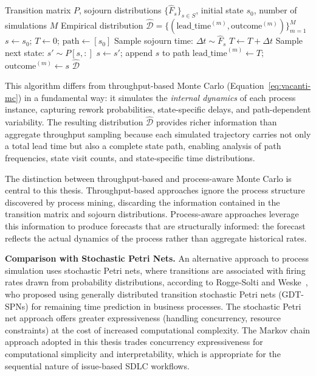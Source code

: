 \begin{algorithm}
\caption{Process-Aware Monte Carlo Simulation}
\label{alg:mc-simulation}
\begin{algorithmic}[1]
\REQUIRE Transition matrix $P$, sojourn distributions $\{\hat{F}_s\}_{s \in S}$, initial state $s_0$, number of simulations $M$
\ENSURE Empirical distribution $\hat{\mathcal{D}} = \{(\text{lead\_time}^{(m)}, \text{outcome}^{(m)})\}_{m=1}^{M}$
    \STATE $s \gets s_0$; $T \gets 0$; $\text{path} \gets [s_0]$
        \STATE Sample sojourn time: $\Delta t \sim \hat{F}_s$
        \STATE $T \gets T + \Delta t$
        \STATE Sample next state: $s' \sim P[s, :]$
        \STATE $s \gets s'$; append $s$ to path
    \ENDWHILE
    \STATE $\text{lead\_time}^{(m)} \gets T$; $\text{outcome}^{(m)} \gets s$
\ENDFOR
\RETURN $\hat{\mathcal{D}}$
\end{algorithmic}
\end{algorithm}

This algorithm differs from throughput-based Monte Carlo
(Equation~\ref{eq:vacanti-mc}) in a fundamental way: it simulates the
\emph{internal dynamics} of each process instance, capturing rework
probabilities, state-specific delays, and path-dependent variability.
The resulting distribution $\hat{\mathcal{D}}$ provides richer information
than aggregate throughput sampling because each simulated trajectory
carries not only a total lead time but also a complete state path, enabling
analysis of path frequencies, state visit counts, and state-specific
time distributions.

The distinction between throughput-based and process-aware Monte Carlo
is central to this thesis. Throughput-based approaches ignore the process
structure discovered by process mining, discarding the information
contained in the transition matrix and sojourn distributions.
Process-aware approaches leverage this information to produce forecasts
that are structurally informed: the forecast reflects the actual dynamics
of the process rather than aggregate historical rates.

\textbf{Comparison with Stochastic Petri Nets.} An alternative approach
to process simulation uses stochastic Petri nets, where transitions are
associated with firing rates drawn from probability
distributions, according to Rogge-Solti and
Weske~\cite{RoggeSolti2015NonMarkovianSPN}, who proposed using generally
distributed transition stochastic Petri nets (GDT-SPNs) for remaining
time prediction in business processes. The stochastic Petri net approach
offers greater expressiveness (handling concurrency, resource constraints)
at the cost of increased computational complexity. The Markov chain
approach adopted in this thesis trades concurrency expressiveness for
computational simplicity and interpretability, which is appropriate for
the sequential nature of issue-based SDLC workflows.


